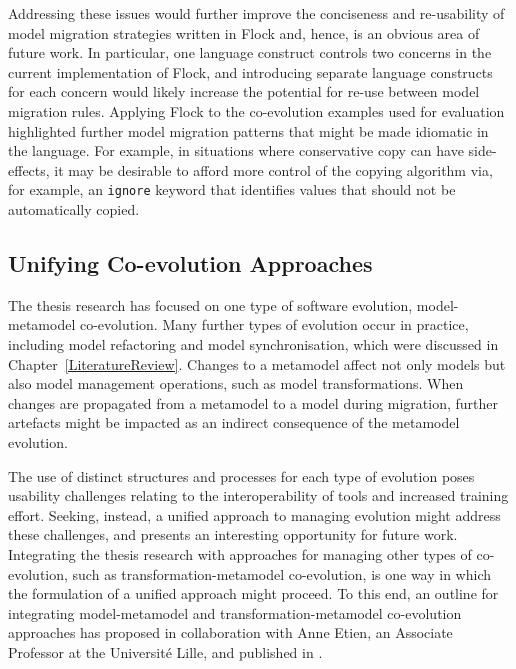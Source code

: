 Addressing these issues would further improve the conciseness and re-usability of model migration strategies written in Flock and, hence, is an obvious area of future work. In particular, one language construct controls two concerns in the current implementation of Flock, and introducing separate language constructs for each concern would likely increase the potential for re-use between model migration rules. Applying Flock to the co-evolution examples used for evaluation highlighted further model migration patterns that might be made idiomatic in the language. For example, in situations where conservative copy can have side-effects, it may be desirable to afford more control of the copying algorithm via, for example, an \texttt{ignore} keyword that identifies values that should not be automatically copied.


\subsection{Unifying Co-evolution Approaches}
The thesis research has focused on one type of software evolution, model-metamodel co-evolution. Many further types of evolution occur in practice, including model refactoring and model synchronisation, which were discussed in Chapter~\ref{LiteratureReview}. Changes to a metamodel affect not only models but also model management operations, such as model transformations. When changes are propagated from a metamodel to a model during migration, further artefacts might be impacted as an indirect consequence of the metamodel evolution.

The use of distinct structures and processes for each type of evolution poses usability challenges relating to the interoperability of tools and increased training effort. Seeking, instead, a unified approach to managing evolution might address these challenges, and presents an interesting opportunity for future work. Integrating the thesis research with approaches for managing other types of co-evolution, such as transformation-metamodel co-evolution, is one way in which the formulation of a unified approach might proceed. To this end, an outline for integrating model-metamodel and transformation-metamodel co-evolution approaches has proposed in collaboration with Anne Etien, an Associate Professor at the Universit\'{e} Lille, and published in \cite{rose10coevolution}.


